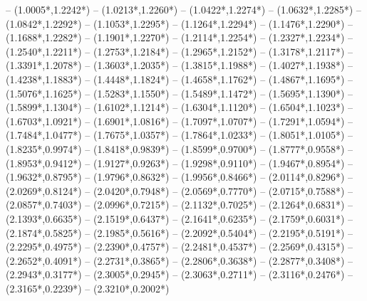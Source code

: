 {	-- ({1.0005*\dx},{1.2242*\dy})
	-- ({1.0213*\dx},{1.2260*\dy})
	-- ({1.0422*\dx},{1.2274*\dy})
	-- ({1.0632*\dx},{1.2285*\dy})
	-- ({1.0842*\dx},{1.2292*\dy})
	-- ({1.1053*\dx},{1.2295*\dy})
	-- ({1.1264*\dx},{1.2294*\dy})
	-- ({1.1476*\dx},{1.2290*\dy})
	-- ({1.1688*\dx},{1.2282*\dy})
	-- ({1.1901*\dx},{1.2270*\dy})
	-- ({1.2114*\dx},{1.2254*\dy})
	-- ({1.2327*\dx},{1.2234*\dy})
	-- ({1.2540*\dx},{1.2211*\dy})
	-- ({1.2753*\dx},{1.2184*\dy})
	-- ({1.2965*\dx},{1.2152*\dy})
	-- ({1.3178*\dx},{1.2117*\dy})
	-- ({1.3391*\dx},{1.2078*\dy})
	-- ({1.3603*\dx},{1.2035*\dy})
	-- ({1.3815*\dx},{1.1988*\dy})
	-- ({1.4027*\dx},{1.1938*\dy})
	-- ({1.4238*\dx},{1.1883*\dy})
	-- ({1.4448*\dx},{1.1824*\dy})
	-- ({1.4658*\dx},{1.1762*\dy})
	-- ({1.4867*\dx},{1.1695*\dy})
	-- ({1.5076*\dx},{1.1625*\dy})
	-- ({1.5283*\dx},{1.1550*\dy})
	-- ({1.5489*\dx},{1.1472*\dy})
	-- ({1.5695*\dx},{1.1390*\dy})
	-- ({1.5899*\dx},{1.1304*\dy})
	-- ({1.6102*\dx},{1.1214*\dy})
	-- ({1.6304*\dx},{1.1120*\dy})
	-- ({1.6504*\dx},{1.1023*\dy})
	-- ({1.6703*\dx},{1.0921*\dy})
	-- ({1.6901*\dx},{1.0816*\dy})
	-- ({1.7097*\dx},{1.0707*\dy})
	-- ({1.7291*\dx},{1.0594*\dy})
	-- ({1.7484*\dx},{1.0477*\dy})
	-- ({1.7675*\dx},{1.0357*\dy})
	-- ({1.7864*\dx},{1.0233*\dy})
	-- ({1.8051*\dx},{1.0105*\dy})
	-- ({1.8235*\dx},{0.9974*\dy})
	-- ({1.8418*\dx},{0.9839*\dy})
	-- ({1.8599*\dx},{0.9700*\dy})
	-- ({1.8777*\dx},{0.9558*\dy})
	-- ({1.8953*\dx},{0.9412*\dy})
	-- ({1.9127*\dx},{0.9263*\dy})
	-- ({1.9298*\dx},{0.9110*\dy})
	-- ({1.9467*\dx},{0.8954*\dy})
	-- ({1.9632*\dx},{0.8795*\dy})
	-- ({1.9796*\dx},{0.8632*\dy})
	-- ({1.9956*\dx},{0.8466*\dy})
	-- ({2.0114*\dx},{0.8296*\dy})
	-- ({2.0269*\dx},{0.8124*\dy})
	-- ({2.0420*\dx},{0.7948*\dy})
	-- ({2.0569*\dx},{0.7770*\dy})
	-- ({2.0715*\dx},{0.7588*\dy})
	-- ({2.0857*\dx},{0.7403*\dy})
	-- ({2.0996*\dx},{0.7215*\dy})
	-- ({2.1132*\dx},{0.7025*\dy})
	-- ({2.1264*\dx},{0.6831*\dy})
	-- ({2.1393*\dx},{0.6635*\dy})
	-- ({2.1519*\dx},{0.6437*\dy})
	-- ({2.1641*\dx},{0.6235*\dy})
	-- ({2.1759*\dx},{0.6031*\dy})
	-- ({2.1874*\dx},{0.5825*\dy})
	-- ({2.1985*\dx},{0.5616*\dy})
	-- ({2.2092*\dx},{0.5404*\dy})
	-- ({2.2195*\dx},{0.5191*\dy})
	-- ({2.2295*\dx},{0.4975*\dy})
	-- ({2.2390*\dx},{0.4757*\dy})
	-- ({2.2481*\dx},{0.4537*\dy})
	-- ({2.2569*\dx},{0.4315*\dy})
	-- ({2.2652*\dx},{0.4091*\dy})
	-- ({2.2731*\dx},{0.3865*\dy})
	-- ({2.2806*\dx},{0.3638*\dy})
	-- ({2.2877*\dx},{0.3408*\dy})
	-- ({2.2943*\dx},{0.3177*\dy})
	-- ({2.3005*\dx},{0.2945*\dy})
	-- ({2.3063*\dx},{0.2711*\dy})
	-- ({2.3116*\dx},{0.2476*\dy})
	-- ({2.3165*\dx},{0.2239*\dy})
	-- ({2.3210*\dx},{0.2002*\dy})
}
